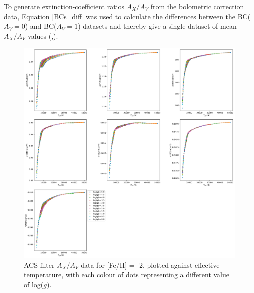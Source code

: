 \documentclass[12pt, a4paper]{report}
\begin{document}
To generate extinction-coefficient ratios $A_{X}/A_{V}$ from the bolometric correction data, Equation \ref{BCs_diff} was used to calculate the differences between the BC($A_{V} = 0$) and BC($A_{V} = 1$) datasets and thereby give a single dataset of mean $A_{X}/A_{V}$ values (\cite{2008PASP..120..583G},\cite{2014MNRAS.444..392C}).

\begin{figure}[h]
\begin{center}
\includegraphics[scale=0.3]{../just_full_data/ACS/AHub_FeHm2p0_just_Teff_fit_plot_dots.pdf}
\caption{ACS filter $A_{X}/A_{V}$ data for [Fe/H] = -2, plotted against effective temperature, with each colour of dots representing a different value of log($g$).}
\label{acs Ax/Av data FeH=-2}
\end{center}
\end{figure}
\end{document}
